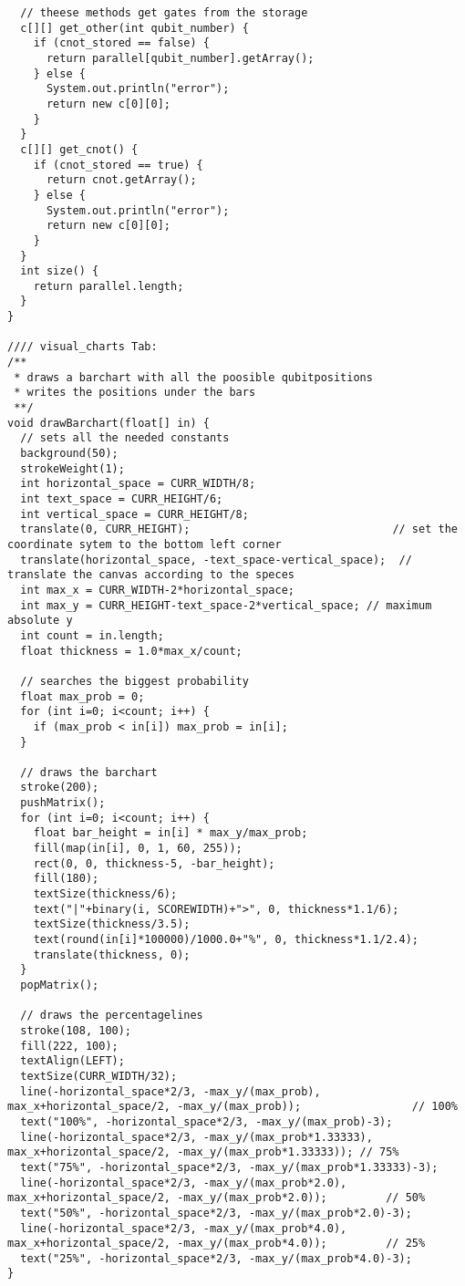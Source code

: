 \documentclass[12pt]{report}
\begin{document}
\begin{lstlisting}
  // theese methods get gates from the storage
  c[][] get_other(int qubit_number) {
    if (cnot_stored == false) {
      return parallel[qubit_number].getArray();
    } else {
      System.out.println("error");
      return new c[0][0];
    }
  }
  c[][] get_cnot() {
    if (cnot_stored == true) {
      return cnot.getArray();
    } else {
      System.out.println("error");
      return new c[0][0];
    }
  }
  int size() {
    return parallel.length;
  }
}

//// visual_charts Tab:
/**
 * draws a barchart with all the poosible qubitpositions
 * writes the positions under the bars
 **/
void drawBarchart(float[] in) {
  // sets all the needed constants
  background(50);
  strokeWeight(1);
  int horizontal_space = CURR_WIDTH/8;
  int text_space = CURR_HEIGHT/6;
  int vertical_space = CURR_HEIGHT/8;
  translate(0, CURR_HEIGHT);                               // set the coordinate sytem to the bottom left corner
  translate(horizontal_space, -text_space-vertical_space);  // translate the canvas according to the speces
  int max_x = CURR_WIDTH-2*horizontal_space;
  int max_y = CURR_HEIGHT-text_space-2*vertical_space; // maximum absolute y
  int count = in.length;
  float thickness = 1.0*max_x/count;

  // searches the biggest probability
  float max_prob = 0;
  for (int i=0; i<count; i++) {
    if (max_prob < in[i]) max_prob = in[i];
  }

  // draws the barchart
  stroke(200);
  pushMatrix();
  for (int i=0; i<count; i++) {
    float bar_height = in[i] * max_y/max_prob;
    fill(map(in[i], 0, 1, 60, 255));
    rect(0, 0, thickness-5, -bar_height);
    fill(180);
    textSize(thickness/6);
    text("|"+binary(i, SCOREWIDTH)+">", 0, thickness*1.1/6);
    textSize(thickness/3.5);
    text(round(in[i]*100000)/1000.0+"%", 0, thickness*1.1/2.4);
    translate(thickness, 0);
  }
  popMatrix();

  // draws the percentagelines
  stroke(108, 100);
  fill(222, 100);
  textAlign(LEFT);
  textSize(CURR_WIDTH/32);
  line(-horizontal_space*2/3, -max_y/(max_prob), max_x+horizontal_space/2, -max_y/(max_prob));                 // 100%
  text("100%", -horizontal_space*2/3, -max_y/(max_prob)-3);
  line(-horizontal_space*2/3, -max_y/(max_prob*1.33333), max_x+horizontal_space/2, -max_y/(max_prob*1.33333)); // 75%
  text("75%", -horizontal_space*2/3, -max_y/(max_prob*1.33333)-3);
  line(-horizontal_space*2/3, -max_y/(max_prob*2.0), max_x+horizontal_space/2, -max_y/(max_prob*2.0));         // 50%
  text("50%", -horizontal_space*2/3, -max_y/(max_prob*2.0)-3);
  line(-horizontal_space*2/3, -max_y/(max_prob*4.0), max_x+horizontal_space/2, -max_y/(max_prob*4.0));         // 25%
  text("25%", -horizontal_space*2/3, -max_y/(max_prob*4.0)-3);
}


\end{lstlisting}
\end{document}
